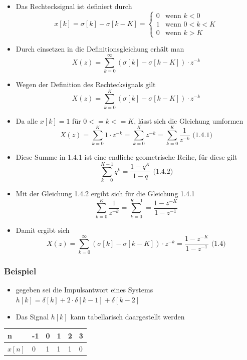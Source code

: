 \documentclass[11pt]{article}
\def\gt{>}
\def\lt{<}
\begin{document}
\begin{itemize}
\item
  Das Rechtecksignal ist definiert durch\\
  \[
  \displaystyle x[k] = \sigma[k] - \sigma[k-K] = \begin{cases}
   0 & \text{wenn $k \lt 0$} \\
   1 & \text{wenn $0 \lt k \lt K$} \\ 
   0 & \text{wenn $k \gt K$}
  \end{cases}
  \]
\item
  Durch einsetzen in die Definitionsgleichung erhält man
  \[X(z) = \sum_{k=0}^\infty (\sigma[k] - \sigma[k-K]) \cdot z^{-k}\]
\item
  Wegen der Definition des Rechtecksignals gilt
  \[X(z) = \sum_{k=0}^K (\sigma[k] - \sigma[k-K]) \cdot z^{-k}\]
\item
  Da alle \(x[k] = 1\) für \(0 <= k <= K\), lässt sich die Gleichung
  umformen
  \[X(z) = \sum_{k=0}^K 1 \cdot z^{-k} = \sum_{k=0}^K z^{-k} = \sum_{k=0}^K \frac{1}{z^{-k}}\textrm{  (1.4.1)}\]
\item
  Diese Summe in 1.4.1 ist eine endliche geometrische Reihe, für diese
  gilt \[\sum_{k=0}^{K-1} q^k = \frac{1-q^K}{1-q}\textrm{  (1.4.2)}\]
\item
  Mit der Gleichung 1.4.2 ergibt sich für die Gleichung 1.4.1
  \[\sum_{k=0}^K \frac{1}{z^{-k}} = \sum_{k=0}^{K-1} = \frac{1-z^{-K}}{1-z^{-1}}\]
\item
  Damit ergibt sich
  \[X(z) = \sum_{k=0}^\infty (\sigma[k] - \sigma[k-K]) \cdot z^{-k} = \frac{1-z^{-K}}{1-z^{-1}} \textrm{  (1.4)}\]
\end{itemize}

    \subsubsection{Beispiel}\label{beispiel}

\begin{itemize}
\item
  gegeben sei die Impulsantwort eines Systems
  \(h[k] = \delta[k] + 2 \cdot \delta[k-1] + \delta[k-2]\)
\item
  Das Signal \(h[k]\) kann tabellarisch daargestellt werden
\end{itemize}

\begin{longtable}[]{@{}llllll@{}}
\toprule
n & -1 & 0 & 1 & 2 & 3\tabularnewline
\midrule
\endhead
\(x[n]\) & 0 & 1 & 1 & 1 & 0\tabularnewline
\bottomrule
\end{longtable}
\end{document}
